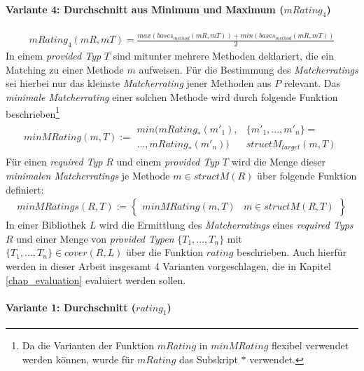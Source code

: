 \paragraph{Variante 4: Durchschnitt aus Minimum und Maximum ($\mathit{mRating}_4$)}

\begin{gather*}
\mathit{mRating_4(mR,mT)} = \frac{\mathit{max(bases_{method}(mR,mT))}+\mathit{min(bases_{method}(mR,mT))}}{2}
\end{gather*}
\noindent
In einem \emph{provided Typ} $T$ sind mitunter mehrere Methoden deklariert, die ein Matching zu einer Methode $m$ aufweisen. Für die Bestimmung des \emph{Matcherratings} sei hierbei nur das kleinste \emph{Matcherrating} jener Methoden aus $P$ relevant. Das \emph{minimale Matcherrating} einer solchen Methode wird durch folgende Funktion beschrieben\footnote{Da die Varianten der Funktion $\mathit{mRating}$ in $\mathit{minMRating}$ flexibel verwendet werden können, wurde für $\mathit{mRating}$ das Subskript $*$ verwendet.}
\begin{gather*}
\mathit{minMRating(m, T)} := 
	\begin{array}{l|l}
\mathit{min(mRating_*(m'_1),}
&
\{\mathit{m'_1,...,m'_n}\} =
\\
\mathit{...,mRating_*(m'_n))}
&
\mathit{structM_{target}(m, T)}
\end{array}
\end{gather*}
\noindent
Für einen \emph{required Typ} $R$ und einem \emph{provided Typ} $T$ wird die Menge dieser \emph{minimalen Matcherratings} je Methode $m \in \mathit{structM(R)}$ über folgende Funktion definiert:
\begin{gather*}
\mathit{minMRatings(R,T)} := \left\{
\begin{array}{l|l}
	\mathit{minMRating(m,T)}
	& 
	m \in \mathit{structM(R,T)}
\end{array}
\right\}
\end{gather*}
\noindent
In einer Bibliothek $L$ wird die Ermittlung des \emph{Matcherratings} eines \emph{required Typs} $R$ und einer Menge von \emph{provided Typen} $\{T_1,...,T_n\}$ mit $\{T_1,...,T_n\} \in \mathit{cover(R,L)}$ über die Funktion $\mathit{rating}$ beschrieben. Auch hierfür werden in dieser Arbeit insgesamt 4 Varianten vorgeschlagen, die in Kapitel \ref{chap_evaluation} evaluiert werden sollen.
\paragraph{Variante 1: Durchschnitt ($\mathit{rating}_1$)}

